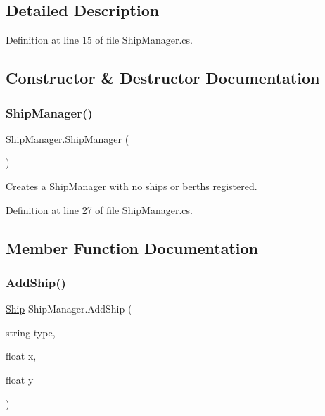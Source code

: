 \subsection{Detailed Description}


Definition at line 15 of file Ship\+Manager.\+cs.



\subsection{Constructor \& Destructor Documentation}
\mbox{\label{class_ship_manager_ac66c77a24cd7fe00ef4083a5eed322ac}} 
\subsubsection{\texorpdfstring{Ship\+Manager()}{ShipManager()}}
{\footnotesize\ttfamily Ship\+Manager.\+Ship\+Manager (\begin{DoxyParamCaption}{ }\end{DoxyParamCaption})}



Creates a \hyperlink{class_ship_manager}{Ship\+Manager} with no ships or berths registered. 



Definition at line 27 of file Ship\+Manager.\+cs.



\subsection{Member Function Documentation}
\mbox{\label{class_ship_manager_a5251a3f11c3d47796f97a541a1ed4c44}} 
\subsubsection{\texorpdfstring{Add\+Ship()}{AddShip()}}
{\footnotesize\ttfamily \hyperlink{class_ship}{Ship} Ship\+Manager.\+Add\+Ship (\begin{DoxyParamCaption}\item[{string}]{type,  }\item[{float}]{x,  }\item[{float}]{y }\end{DoxyParamCaption})}



